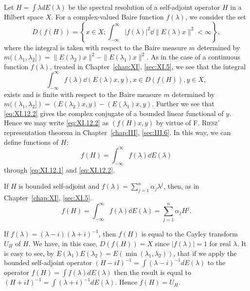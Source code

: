 Let $H = \int \lambda dE(\lambda)$ be the spectral resolution of a self-adjoint operator $H$ in a Hilbert space $X$. For a complex-valued Baire function $f(\lambda)$, we consider the set 
\begin{equation}\label{eq:XI.12.1}
D (f (H)) = \left\{x \in X; \int_{- \infty} ^{\infty} | f (\lambda) | ^{2} \dd \| E (\lambda) x \| ^{2} < \infty \right\},
\end{equation}
where the integral is taken with respect to the Baire measure $m$ determined by $m((\lambda_{1}, \lambda_{2}]) = \|E(\lambda_{2})x\|^{2} - \|E(\lambda_{1})x\|^{2}$. As in the case of a continuous function $f(\lambda)$, treated in Chapter~\ref{chap:XI}, \ref{sec:XI.5}, we see that the integral 
\begin{equation}\label{eq:XI.12.2}
\int_{- \infty} ^{\infty} f (\lambda) \dd (E (\lambda) x, y), x \in D (f (H)), y \in X,
\end{equation}
exists and is finite with respect to the Baire measure $m$ determined by $m((\lambda_{1}, \lambda_{2}]) = (E(\lambda_{2})x, y) - (E(\lambda_{1})x, y)$. Further we see that \eqref{eq:XI.12.2} gives the complex conjugate of a bounded linear functional of $y$. Hence we may write \eqref{eq:XI.12.2} as $(f(H)x, y)$ by virtue of F. \textsc{Riesz}' representation theorem in Chapter~\ref{chap:III}, \ref{sec:III.6}. In this way, we can define functions of $H$: 
\begin{equation}\label{eq:XI.12.3}
f (H) = \int_{- \infty} ^{\infty} f (\lambda) \dd E (\lambda)
\end{equation}
through \eqref{eq:XI.12.1} and \eqref{eq:XI.12.2}. 

\begin{example}\label{ex:XI.12.Example.1} If $H$ is bounded self-adjoint and $f(\lambda) = \sum\limits_{j=1}^{n} \alpha_j \lambda^j$, then, as in Chapter~\ref{chap:XI}, \ref{sec:XI.5}. 
\[
f (H) = \int_{- \infty} ^{\infty} f (\lambda) \dd E (\lambda) = \sum\limits_{j=1} ^{n} \alpha_{j} H ^{j}.
\]
\end{example}

\begin{example}\label{ex:XI.12.Example.2} If $f(\lambda) = (\lambda - i)(\lambda + i)^{-1}$, then $f(H)$ is equal to the Cayley transform $U_H$ of $H$. We have, in this case, $D(f(H)) = X$ since $|f(\lambda)| = 1$ for real $\lambda$. It is easy to see, by $E(\lambda_1)E(\lambda_2) = E(\min (\lambda_1, \lambda_2))$, that if we apply the bounded self-adjoint operator $(H - iI)^{-1} = \int (\lambda - i)^{-1} dE(\lambda)$ to the operator $f(H) = \int f(\lambda) dE(\lambda)$ then the result is equal to $(H + iI)^{-1} = \int (\lambda + i)^{-1} dE(\lambda)$. Hence $f(H) = U_H$. 
\end{example}

